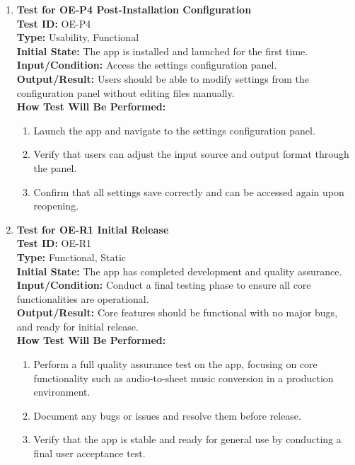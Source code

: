 \documentclass[12pt, titlepage]{article}
\begin{document}
\begin{enumerate}
    \item \textbf{Test for OE-P4 Post-Installation Configuration} \\
      \newline
      \textbf{Test ID:} OE-P4 \\
      \textbf{Type:} Usability, Functional \\
      \textbf{Initial State:} The app is installed and launched for the first time. \\
      \textbf{Input/Condition:} Access the settings configuration panel. \\
      \textbf{Output/Result:} Users should be able to modify settings from the configuration panel without editing files manually. \\
      \textbf{How Test Will Be Performed:}
      \begin{enumerate}
          \item Launch the app and navigate to the settings configuration panel.
          \item Verify that users can adjust the input source and output format through the panel.
          \item Confirm that all settings save correctly and can be accessed again upon reopening.
      \end{enumerate}

    \item \textbf{Test for OE-R1 Initial Release} \\
      \newline
      \textbf{Test ID:} OE-R1 \\
      \textbf{Type:} Functional, Static \\
      \textbf{Initial State:} The app has completed development and quality assurance. \\
      \textbf{Input/Condition:} Conduct a final testing phase to ensure all core functionalities are operational. \\
      \textbf{Output/Result:} Core features should be functional with no major bugs, and ready for initial release. \\
      \textbf{How Test Will Be Performed:}
      \begin{enumerate}
          \item Perform a full quality assurance test on the app, focusing on core functionality such as audio-to-sheet music 
          conversion in a production environment.
          \item Document any bugs or issues and resolve them before release.
          \item Verify that the app is stable and ready for general use by conducting a final user acceptance test.
      \end{enumerate}

\end{enumerate}
\end{document}
